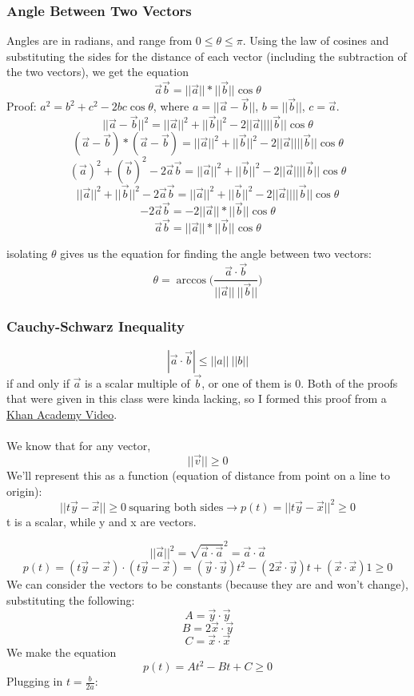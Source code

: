\documentclass{article}
\begin{document}
	\subsubsection{Angle Between Two Vectors}
	Angles are in radians, and range from $0 \leq \theta \leq \pi$.
	Using the law of cosines and substituting the sides for the distance of each vector
	(including the subtraction of the two vectors), we get the equation 
	$$ \vec{a}\vec{b} = ||\vec{a}||*||\vec{b}||\cos{\theta} $$
	Proof:
	$a^2 = b^2 + c^2 - 2bc\cos{\theta}$, where $a = ||\vec{a} - \vec{b}||$, $b = ||\vec{b}||$, $c=\vec{a}$. 
	$$ || \vec{a} - \vec{b} ||^2 = ||\vec{a}||^2 + ||\vec{b}||^2 - 2||\vec{a}||||\vec{b}||\cos{\theta}$$
	$$ (\vec{a} - \vec{b}) * (\vec{a} - \vec{b}) = ||\vec{a}||^2 + ||\vec{b}||^2 - 2||\vec{a}||||\vec{b}||\cos{\theta}$$
	$$ (\vec{a})^2 + (\vec{b})^2 - 2\vec{a}\vec{b} =||\vec{a}||^2 + ||\vec{b}||^2 - 2||\vec{a}||||\vec{b}||\cos{\theta} $$ 
	$$ ||\vec{a}||^2 + ||\vec{b}||^2 - 2\vec{a}\vec{b} =||\vec{a}||^2 + ||\vec{b}||^2 - 2||\vec{a}||||\vec{b}||\cos{\theta} $$
$$ - 2\vec{a}\vec{b} = -2||\vec{a}||*||\vec{b}||\cos{\theta} $$
$$ \vec{a}\vec{b} = ||\vec{a}||*||\vec{b}||\cos{\theta} $$

isolating $\theta$ gives us the equation for finding the angle between two vectors:
$$\theta = \arccos\biggl(\frac{\vec{a}\cdot\vec{b}} {||\vec{a}|| \ ||\vec{b}||}\biggr) $$
\subsubsection{Cauchy-Schwarz Inequality}
$$|\vec{a}\cdot\vec{b}| \leq ||a|| \ ||b||$$ if and only if $\vec{a}$ is a scalar multiple of $\vec{b}$, or
one of them is 0.
Both of the proofs that were given in this class were kinda lacking, so I formed this proof from a 
\href{https://www.khanacademy.org/math/linear-algebra/vectors-and-spaces/dot-cross-products/v/proof-of-the-cauchy-schwarz-inequality}{Khan Academy Video}.
\\\\
We know that for any vector, $$||\vec{v}|| \geq 0$$
We'll represent this as a function (equation of distance from point on a line to origin):
$$ ||t\vec{y} - \vec{x}|| \geq 0\  \text{squaring both sides} \rightarrow p(t) = ||t\vec{y} - \vec{x}||^2 \geq 0$$
t is a scalar, while y and x are vectors. 

$$ ||\vec{a}||^2 =  \sqrt{\vec{a}\cdot \vec{a}}^2 = \vec{a}\cdot \vec{a}$$
$$ p(t) = (t\vec{y} - \vec{x})\cdot(t\vec{y} - \vec{x}) =
(\vec{y}\cdot\vec{y}) t^2 - (2\vec{x}\cdot\vec{y})t + (\vec{x}\cdot\vec{x})1 \geq 0$$
We can consider the vectors to be constants (because they are and won't change), substituting the following:
$$ A = \vec{y}\cdot\vec{y}$$
$$ B = 2\vec{x}\cdot\vec{y}$$
$$ C = \vec{x}\cdot\vec{x}$$
We make the equation
$$ p(t) = At^2 - Bt + C \geq 0$$
Plugging in $t = \frac{b}{2a}$:
\end{document}

